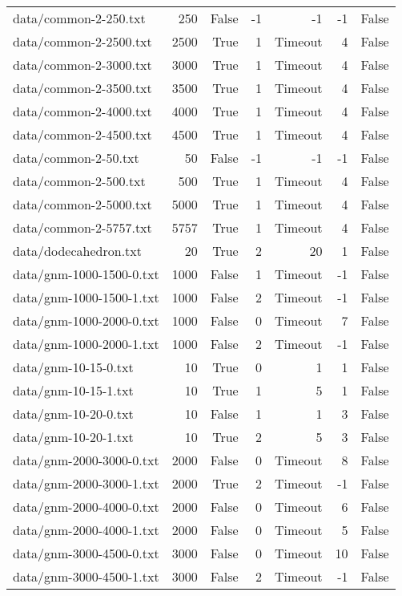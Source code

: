 \begin{tabular}{lrrrrrr}
data/common-2-250.txt & 250 & False & -1 & -1 & -1 & False \\
data/common-2-2500.txt & 2500 & True & 1 & Timeout & 4 & False \\
data/common-2-3000.txt & 3000 & True & 1 & Timeout & 4 & False \\
data/common-2-3500.txt & 3500 & True & 1 & Timeout & 4 & False \\
data/common-2-4000.txt & 4000 & True & 1 & Timeout & 4 & False \\
data/common-2-4500.txt & 4500 & True & 1 & Timeout & 4 & False \\
data/common-2-50.txt & 50 & False & -1 & -1 & -1 & False \\
data/common-2-500.txt & 500 & True & 1 & Timeout & 4 & False \\
data/common-2-5000.txt & 5000 & True & 1 & Timeout & 4 & False \\
data/common-2-5757.txt & 5757 & True & 1 & Timeout & 4 & False \\
data/dodecahedron.txt & 20 & True & 2 & 20 & 1 & False \\
data/gnm-1000-1500-0.txt & 1000 & False & 1 & Timeout & -1 & False \\
data/gnm-1000-1500-1.txt & 1000 & False & 2 & Timeout & -1 & False \\
data/gnm-1000-2000-0.txt & 1000 & False & 0 & Timeout & 7 & False \\
data/gnm-1000-2000-1.txt & 1000 & False & 2 & Timeout & -1 & False \\
data/gnm-10-15-0.txt & 10 & True & 0 & 1 & 1 & False \\
data/gnm-10-15-1.txt & 10 & True & 1 & 5 & 1 & False \\
data/gnm-10-20-0.txt & 10 & False & 1 & 1 & 3 & False \\
data/gnm-10-20-1.txt & 10 & True & 2 & 5 & 3 & False \\
data/gnm-2000-3000-0.txt & 2000 & False & 0 & Timeout & 8 & False \\
data/gnm-2000-3000-1.txt & 2000 & True & 2 & Timeout & -1 & False \\
data/gnm-2000-4000-0.txt & 2000 & False & 0 & Timeout & 6 & False \\
data/gnm-2000-4000-1.txt & 2000 & False & 0 & Timeout & 5 & False \\
data/gnm-3000-4500-0.txt & 3000 & False & 0 & Timeout & 10 & False \\
data/gnm-3000-4500-1.txt & 3000 & False & 2 & Timeout & -1 & False \\

\end{tabular}
